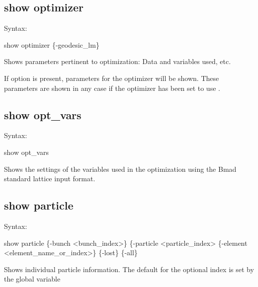 {{{{{\subsection{show optimizer}
\label{s:show.optimizer}

Syntax:
\begin{example}
  show optimizer \{-geodesic_lm\}
\end{example}


Shows parameters pertinent to optimization: Data and variables used,
etc. 

If  option is present, parameters for the  optimizer will
be shown. These parameters are shown in any case if the optimizer has been set to use
.



\subsection{show opt_vars}
\label{s:show.opt.vars}

Syntax:
\begin{example}
  show opt_vars
\end{example}


Shows the settings of the variables used in the optimization using the Bmad standard
lattice input format.


\subsection{show particle}
\label{s:show.particle}

Syntax:
\begin{example}
    show particle \{-bunch <bunch_index>\} \{-particle <particle_index>
    \{-element <element_name_or_index>\} \{-lost\} \{-all\}
\end{example}


Shows individual particle information. The default for the optional  index is
set by the global variable \vn{global%
starting position). Also see \vn{show beam}.

The \vn{-lost} option shows which particles are lost during beam tracking. Note: Using the
\vn{-lost} option results in one line printed for each lost particle. It is thus meant for
use with bunches with a small number of particles.

}}}}}}
